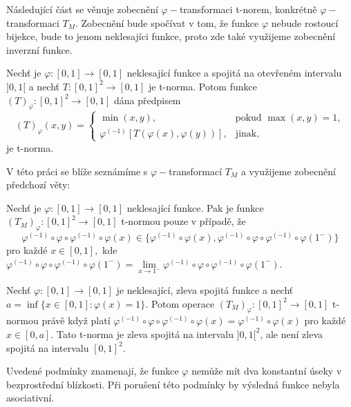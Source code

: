 Následující část se věnuje zobecn\v en\'i $\varphi-$transformaci t-norem, konkr\'etn\v e $\varphi-$transformaci $T_M.$ Zobecn\v en\'i bude spo\v c\'ivat v tom, \v ze funkce $\varphi$ nebude rostouc\'i bijekce, bude to jenom neklesaj\'ici funkce, proto zde tak\'e vyu\v zijeme zobecn\v en\'i inverzn\'i funkce. 
\begin{sentence}\cite{KMP}\label{subnorma}
     Nech\v t je $\varphi : [0,1] \rightarrow [0,1]$ neklesající funkce a  spojitá na otev\v ren\'em intervalu
 $]0,1[$ a nech\v t $T: [0,1]^2 \rightarrow [0,1]$ je t-norma. Potom funkce
    $(T)_\varphi : [0,1]^2 \rightarrow [0,1]$ dána p\v redpisem $$(T)_\varphi (x,y)= \begin{cases} \min(x,y), & \mbox {pokud } \max(x,y) = 1,
    \\ \varphi^{(-1)}[T(\varphi(x), \varphi(y))], & \mbox {jinak,}
    \end{cases}$$
    je t-norma.
  \end{sentence}
  V této práci se blí\v ze seznámíme s $\varphi-$transformací $T_M$ a využijeme zobecnění předchozí věty:

\begin{sentence} 
\cite{hlinena}
\label{smut} Nech\v t je $\varphi \colon [0,1] \to [0,1]$ neklesající funkce. Pak je funkce $(T_M)_\varphi\colon[0,1]^2\to[0,1]$  t-normou pouze v případě, že
$$\varphi^{(-1)}\circ\varphi\circ\varphi^{(-1)}\circ\varphi(x)\in \{\varphi^{(-1)}\circ\varphi(x),\varphi^{(-1)}\circ\varphi\circ\varphi^{(-1)}\circ\varphi(1^-)\}$$
pro každé $x\in[0,1],$ kde $\varphi^{(-1)}\circ\varphi\circ\varphi^{(-1)}\circ\varphi(1^-)=\lim\limits_{x\to 1^-}\varphi^{(-1)}\circ\varphi\circ\varphi^{(-1)}\circ\varphi(1^-).$
\end{sentence}
\begin{remark}
\cite{mitav}
    Nech\v t $\varphi\colon[0,1]\to [0,1]$ je neklesající, zleva spojitá  funkce a nechť $a=\inf\{x \in [0,1]\colon \varphi(x)=1\}.$ Potom operace $(T_M)_\varphi\colon[0,1]^2\to[0,1]$ t-normou právě když platí $\varphi^{(-1)}\circ\varphi\circ\varphi^{(-1)}\circ\varphi(x)=\varphi^{(-1)}\circ\varphi(x)$ pro každé $x \in [0,a].$ Tato  t-norma je zleva spojitá na intervalu  $]0,1[^2$, ale není zleva spojitá na  intervalu $[0,1]^2.$
\end{remark}

Uveden\'e podm\'inky znamenaj\'i, \v ze funkce $\varphi$ nem\r u\v ze m\'it dva konstantn\'i \'useky v bezprost\v redn\'i bl\'izkosti. P\v ri poru\v sen\'i t\'eto podm\'inky by v\'ysledn\'a funkce nebyla asociativn\'i.
\bigskip


